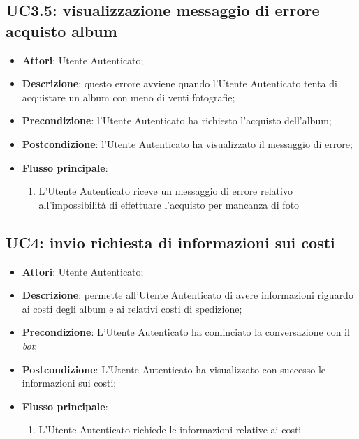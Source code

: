 
\subsection{UC3.5: visualizzazione messaggio di errore acquisto album}
\label{uc:uc3.5}
\hypertarget{UC3.5}{}

\begin{itemize}
  \item \textbf{Attori}: Utente Autenticato;
  \item \textbf{Descrizione}: questo errore avviene quando l'Utente Autenticato
tenta di acquistare un album con meno di venti fotografie;
  \item \textbf{Precondizione}: l'Utente Autenticato ha richiesto l'acquisto
dell'album;
  \item \textbf{Postcondizione}: l'Utente Autenticato ha visualizzato il
messaggio di errore;
  \item \textbf{Flusso principale}:
  \begin{enumerate}
    \item L'Utente Autenticato riceve un messaggio di errore relativo
all'impossibilità di effettuare l'acquisto per mancanza di foto
  \end{enumerate}
\end{itemize}





\subsection{UC4: invio richiesta di informazioni sui costi}
\label{uc:uc4}
\hypertarget{UC4}{}

\begin{itemize}
  \item \textbf{Attori}: Utente Autenticato;
  \item \textbf{Descrizione}: permette all'Utente Autenticato di avere
informazioni riguardo ai costi degli album e ai relativi costi di spedizione;
  \item \textbf{Precondizione}: L'Utente Autenticato ha cominciato la
conversazione con il \textit{bot};
  \item \textbf{Postcondizione}: L'Utente Autenticato ha visualizzato con
successo le informazioni sui costi;
  \item \textbf{Flusso principale}:
  \begin{enumerate}
    \item L'Utente Autenticato richiede le informazioni relative ai costi
  \end{enumerate}
\end{itemize}


